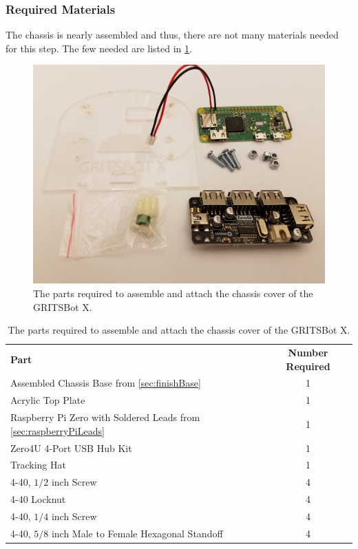 \subsubsection{Required Materials}
\label{sec:topPlateMaterials}

The chassis is nearly assembled and thus, there are not many materials needed for this step. The few needed are  listed in \cref{tab:topPlateMaterials}.

\begin{figure}[h!]
\centering
\includegraphics[width=0.65\columnwidth, keepaspectratio]{./figs/20190107_091402.jpg}
\caption{The parts required to assemble and attach the chassis cover of the GRITSBot X.}
\label{fig:topPlateMaterials}
\end{figure}

 \begin{table}[h!]
 \centering
\begin{tabular}{p{3in}c}
\rowcolor[HTML]{C0C0C0} 
\textbf{Part}  & \textbf{Number Required} 		\\
Assembled Chassis Base from \cref{sec:finishBase}		& 1	\\
\rowcolor[HTML]{C0C0C0} 
Acrylic Top Plate			& 1	\\
Raspberry Pi Zero with Soldered Leads from \cref{sec:raspberryPiLeads}	& 1	\\
\rowcolor[HTML]{C0C0C0} 
Zero4U 4-Port USB Hub	 Kit	& 1 \\
Tracking Hat				& 1 \\
\rowcolor[HTML]{C0C0C0} 
4-40, $1/2$ inch Screw	& 4  \\
4-40 Locknut	& 4\\
\rowcolor[HTML]{C0C0C0} 
4-40, $1/4$ inch Screw	& 4  \\
4-40, $5/8$ inch Male to Female Hexagonal Standoff	& 4\\
\end{tabular}
\caption{The parts required to assemble and attach the chassis cover of the GRITSBot X. \label{tab:topPlateMaterials}}
\end{table}

